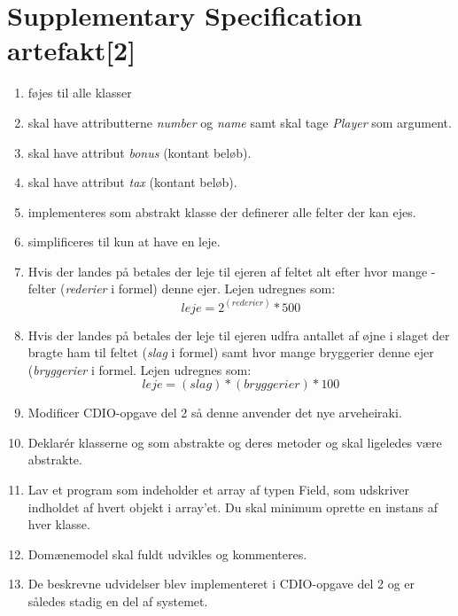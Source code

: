 \chapter{Supplementary Specification artefakt[2]}\label{chap:suppSpec}

\begin{enumerate}
\item {} føjes til alle klasser
\item {} skal have attributterne \textit{number} og \textit{name} samt  skal tage \textit{Player} som argument.
\item {} skal have attribut \textit{bonus} (kontant beløb).
\item {} skal have attribut \textit{tax} (kontant beløb).
\item {} implementeres som abstrakt klasse der definerer alle felter der kan ejes. 
\item {} simplificeres til kun at have en leje.
\item Hvis der landes på  betales der leje til ejeren af feltet alt efter hvor mange -felter (\textit{rederier} i formel) denne ejer. Lejen udregnes som: $$leje=2^{(rederier)}*500$$
\item Hvis der landes på  betales der leje til ejeren udfra antallet af øjne i slaget der bragte ham til feltet (\textit{slag} i formel) samt hvor mange bryggerier denne ejer (\textit{bryggerier} i formel. Lejen udregnes som: $$leje=(slag)*(bryggerier)*100$$
\item Modificer CDIO-opgave del 2 så denne anvender det nye arveheiraki.
\item Deklarér klasserne  og  som abstrakte og deres metoder  og  skal ligeledes være abstrakte.
\item Lav et program  som indeholder et array af typen Field, som udskriver indholdet af hvert objekt i array’et. Du skal minimum oprette en instans af hver klasse.
\item Domænemodel skal fuldt udvikles og kommenteres.  
\item De beskrevne udvidelser blev implementeret i CDIO-opgave del 2 og er således stadig en del af systemet. 
\end{enumerate}